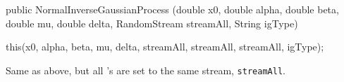 \begin{code}

   public NormalInverseGaussianProcess (double x0, double alpha,
                                        double beta, double mu,
                                        double delta,
                                        RandomStream streamAll,
                                        String igType) \begin{hide} {
        this(x0, alpha, beta, mu, delta, streamAll, streamAll, streamAll, igType);
    }\end{hide}
\end{code}
\begin{tabb} Same as above, but all 's 
are set to the same stream, \texttt{streamAll}.
\end{tabb}

